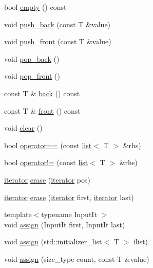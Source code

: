 \begin{DoxyCompactItemize}
\item 
bool \mbox{\hyperlink{classsc_1_1list_aeb4d6c3d1fc142b0ff35a3ec203b7b3f}{empty}} () const
\item 
void \mbox{\hyperlink{classsc_1_1list_a86207fd2b1a6355882e0f1c581b5bc65}{push\+\_\+back}} (const T \&value)
\item 
void \mbox{\hyperlink{classsc_1_1list_aff098c381e8ad50e58c20c668d4d5d77}{push\+\_\+front}} (const T \&value)
\item 
void \mbox{\hyperlink{classsc_1_1list_a0e208afb64eed97d8d9d9315ba211f3c}{pop\+\_\+back}} ()
\item 
void \mbox{\hyperlink{classsc_1_1list_a4e0d8595c1bd85d33a503fbc7bfe6940}{pop\+\_\+front}} ()
\item 
const T \& \mbox{\hyperlink{classsc_1_1list_a57f6bddf67f5d60b5d3293150fbb52a6}{back}} () const
\item 
const T \& \mbox{\hyperlink{classsc_1_1list_a15e1380ab91bf786fa4b34b802d66c0b}{front}} () const
\item 
void \mbox{\hyperlink{classsc_1_1list_ada3f13df5cabc23e702baa64f1b5f76e}{clear}} ()
\item 
bool \mbox{\hyperlink{classsc_1_1list_a36a0bdec0e219977b7f36bf1665fea35}{operator==}} (const \mbox{\hyperlink{classsc_1_1list}{list}}$<$ T $>$ \&rhs)
\item 
bool \mbox{\hyperlink{classsc_1_1list_add9f9d9fb6302969e9ac7822e46ff222}{operator!=}} (const \mbox{\hyperlink{classsc_1_1list}{list}}$<$ T $>$ \&rhs)
\item 
\mbox{\hyperlink{classsc_1_1list_1_1iterator}{iterator}} \mbox{\hyperlink{classsc_1_1list_a12a195a7ebaf3455f245caa852b44a9b}{erase}} (\mbox{\hyperlink{classsc_1_1list_1_1iterator}{iterator}} pos)
\item 
\mbox{\hyperlink{classsc_1_1list_1_1iterator}{iterator}} \mbox{\hyperlink{classsc_1_1list_ae796301c82f58d72d10ec7c30fb0b024}{erase}} (\mbox{\hyperlink{classsc_1_1list_1_1iterator}{iterator}} first, \mbox{\hyperlink{classsc_1_1list_1_1iterator}{iterator}} last)
\item 
{\footnotesize template$<$typename Input\+It $>$ }\\void \mbox{\hyperlink{classsc_1_1list_a5886cd0296e187a96777dd837eaed99b}{assign}} (Input\+It first, Input\+It last)
\item 
void \mbox{\hyperlink{classsc_1_1list_a495ac9f4a80b40ba7d37e6badf24445f}{assign}} (std\+::initializer\+\_\+list$<$ T $>$ ilist)
\item 
void \mbox{\hyperlink{classsc_1_1list_a3578c78367327dba848baa746882640a}{assign}} (size\+\_\+type count, const T \&value)

\end{DoxyCompactItemize}
